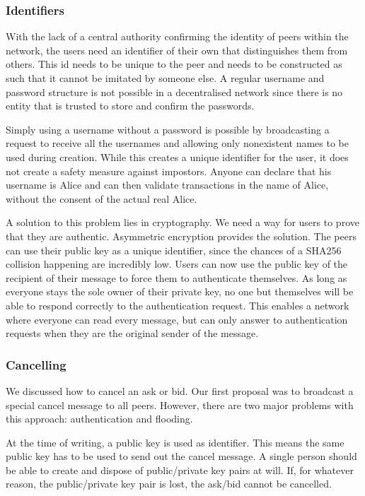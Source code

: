 \documentclass[]{article}
\begin{document}
\subsubsection{Identifiers}
\label{sprint1:identifiers}
With the lack of a central authority confirming the identity of peers within the network, the users need an identifier of their own that distinguishes them from others.
This id needs to be unique to the peer and needs to be constructed as such that it cannot be imitated by someone else.
A regular username and password structure is not possible in a decentralised network since there is no entity that is trusted to store and confirm the passwords.


Simply using a username without a password is possible by broadcasting a request to receive all the usernames and allowing only nonexistent names to be used during creation.
While this creates a unique identifier for the user, it does not create a safety measure against impostors.
Anyone can declare that his username is Alice and can then validate transactions in the name of Alice, without the consent of the actual real Alice.

A solution to this problem lies in cryptography.
We need a way for users to prove that they are authentic.
Asymmetric encryption provides the solution.
The peers can use their public key as a unique identifier, since the chances of a SHA256 collision happening are incredibly low.
Users can now use the public key of the recipient of their message to force them to authenticate themselves.
As long as everyone stays the sole owner of their private key, no one but themselves will be able to respond correctly to the authentication request.
This enables a network where everyone can read every message, but can only answer to authentication requests when they are the original sender of the message.


\subsubsection{Cancelling}
\label{sprint1:cancelling}
We discussed how to cancel an ask or bid.
Our first proposal was to broadcast a special cancel message to all peers.
However, there are two major problems with this approach: authentication and flooding.


At the time of writing, a public key is used as identifier.
This means the same public key has to be used to send out the cancel message.
A single person should be able to create and dispose of public/private key pairs at will.
If, for whatever reason, the public/private key pair is lost, the ask/bid cannot be cancelled.
\end{document}

